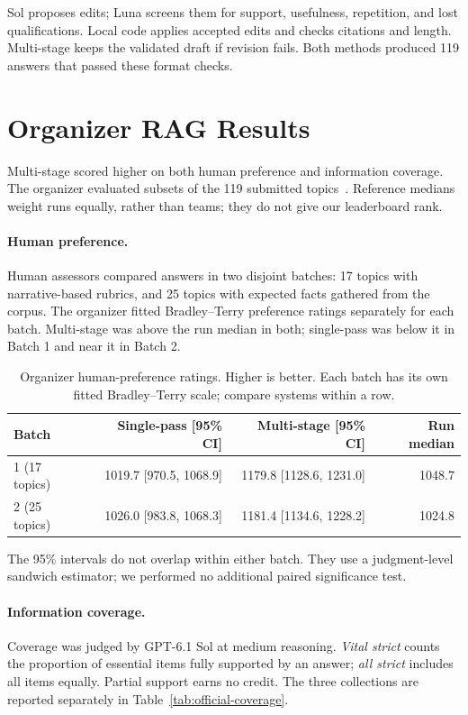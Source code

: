 \documentclass[11pt,letterpaper]{article}
\begin{document}
Sol proposes edits; Luna screens them for support, usefulness, repetition, and lost qualifications. Local code applies accepted edits and checks citations and length. Multi-stage keeps the validated draft if revision fails. Both methods produced 119 answers that passed these format checks.

\clearpage
\section{Organizer RAG Results}
Multi-stage scored higher on both human preference and information coverage. The organizer evaluated subsets of the 119 submitted topics~\cite{organizer2026}. Reference medians weight runs equally, rather than teams; they do not give our leaderboard rank.

\paragraph{Human preference.}
Human assessors compared answers in two disjoint batches: 17 topics with narrative-based rubrics, and 25 topics with expected facts gathered from the corpus. The organizer fitted Bradley--Terry preference ratings separately for each batch. Multi-stage was above the run median in both; single-pass was below it in Batch 1 and near it in Batch 2.

\begin{table}[H]\centering\small
\begin{tabular}{@{}lrrr@{}}\toprule
Batch & Single-pass [95\% CI] & Multi-stage [95\% CI] & Run median\\\midrule
1 (17 topics) & 1019.7 [970.5, 1068.9] & 1179.8 [1128.6, 1231.0] & 1048.7\\
2 (25 topics) & 1026.0 [983.8, 1068.3] & 1181.4 [1134.6, 1228.2] & 1024.8\\\bottomrule
\end{tabular}
\caption{Organizer human-preference ratings. Higher is better. Each batch has its own fitted Bradley--Terry scale; compare systems within a row.}
\label{tab:official-preference}
\end{table}

The 95\% intervals do not overlap within either batch. They use a judgment-level sandwich estimator; we performed no additional paired significance test.

\paragraph{Information coverage.}
Coverage was judged by GPT-6.1 Sol at medium reasoning. \emph{Vital strict} counts the proportion of essential items fully supported by an answer; \emph{all strict} includes all items equally. Partial support earns no credit. The three collections are reported separately in Table~\ref{tab:official-coverage}.
\end{document}

